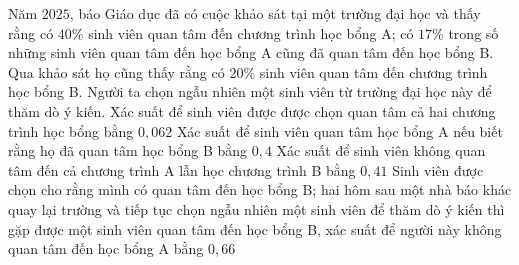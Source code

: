 \cauds
\begin{ex}%
	Năm $2025$, báo Giáo dục đã có cuộc khảo sát tại một trường đại học và thấy rằng có $40\%$ sinh viên quan tâm đến chương trình học bổng A; có $17\%$ trong số những sinh viên quan tâm đến học bổng A cũng đã quan tâm đến học bổng B. Qua khảo sát họ cũng thấy rằng có $20\%$ sinh viên quan tâm đến chương trình học bổng B. Người ta chọn ngẫu nhiên một sinh viên từ trường đại học này để thăm dò ý kiến.
	\choiceTF
	{Xác suất để sinh viên được được chọn quan tâm cả hai chương trình học bổng bằng $0{,}062$}
	{Xác suất để sinh viên quan tâm học bổng A nếu biết rằng họ đã quan tâm học bổng B bằng $0{,}4$}
	{Xác suất để sinh viên không quan tâm đến cả chương trình A lẫn học chương trình B bằng $0{,}41$}
	{\True Sinh viên được chọn cho rằng mình có quan tâm đến học bổng B; hai hôm sau một nhà báo khác quay lại trường và tiếp tục chọn ngẫu nhiên một sinh viên để thăm dò ý kiến thì gặp được một sinh viên quan tâm đến học bổng B, xác suất để người này không quan tâm đến học bổng A bằng $0{,}66$}
\end{ex}
